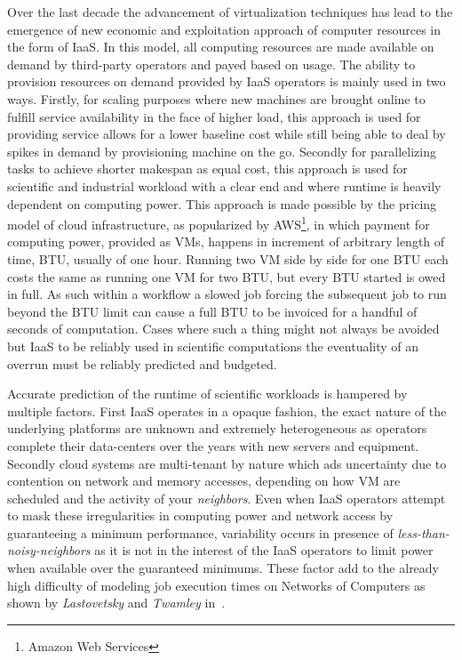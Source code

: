 \documentclass[10pt,conference,compsocconf]{IEEEtran}
\begin{document}
Over the  last decade the advancement  of virtualization techniques has  lead to
the emergence of new economic and exploitation approach of computer resources in
the form of \ac{IaaS}. In this model, all computing resources are made available
on demand  by third-party operators  and payed based  on usage.  The  ability to
provision resources on demand provided by  \ac{IaaS} operators is mainly used in
two ways.  Firstly,  for scaling purposes where new machines  are brought online
to fulfill  service availability in  the face of  higher load, this  approach is
used for  providing service allows for  a lower baseline cost  while still being
able to deal  by spikes in demand  by provisioning machine on  the go.  Secondly
for parallelizing tasks to achieve shorter makespan as equal cost, this approach
is  used for  scientific and  industrial  workload with  a clear  end and  where
runtime is heavily dependent on computing power.  This approach is made possible
by   the   pricing   model   of  cloud   infrastructure,   as   popularized   by
AWS\footnote{Amazon  Web  Services},  in  which  payment  for  computing  power,
provided  as  \acp{VM},  happens  in  increment of  arbitrary  length  of  time,
\ac{BTU}, usually of one hour. Running two \ac{VM} side by side for one \ac{BTU}
each costs  the same  as running  one \ac{VM}  for two  \ac{BTU}, but  every BTU
started is  owed in full.  As  such within a  workflow a slowed job  forcing the
subsequent job to run beyond the \ac{BTU}  limit can cause a full \ac{BTU} to be
invoiced for a handful of seconds of computation. Cases where such a thing might
not  always  be  avoided  but  \ac{IaaS}  to  be  reliably  used  in  scientific
computations  the eventuality  of  an  overrun must  be  reliably predicted  and
budgeted.

Accurate  prediction of  the  runtime  of scientific  workloads  is hampered  by
multiple factors. First \ac{IaaS} operates in a opaque fashion, the exact nature
of the underlying platforms are unknown and extremely heterogeneous as operators
complete  their data-centers  over the  years  with new  servers and  equipment.
Secondly cloud systems  are multi-tenant by nature which ads  uncertainty due to
contention  on  network  and  memory  accesses, depending  on  how  \ac{VM}  are
scheduled  and  the activity  of  your  \emph{neighbors}.  Even  when  \ac{IaaS}
operators attempt  to mask these  irregularities in computing power  and network
access by guaranteeing a minimum  performance, variability occurs in presence of
\emph{less-than-noisy-neighbors} as it  is not in the interest  of the \ac{IaaS}
operators to  limit power  when available over  the guaranteed  minimums.  These
factor add  to the already  high difficulty of  modeling job execution  times on
Networks  of  Computers  as   shown  by  \emph{Lastovetsky}  and  \emph{Twamley}
in~\cite{Lastovetsky05}.
\end{document}
